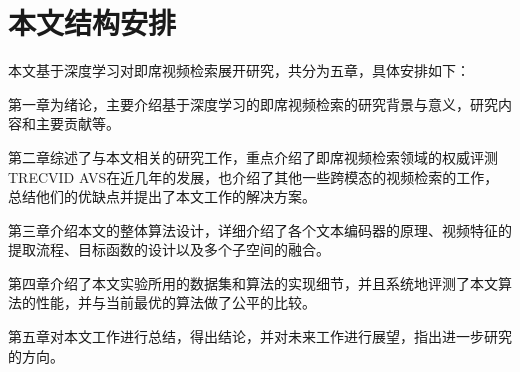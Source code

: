\section{本文结构安排}
本文基于深度学习对即席视频检索展开研究，共分为五章，具体安排如下：

第一章为绪论，主要介绍基于深度学习的即席视频检索的研究背景与意义，研究内容和主要贡献等。

第二章综述了与本文相关的研究工作，重点介绍了即席视频检索领域的权威评测TRECVID AVS在近几年的发展，也介绍了其他一些跨模态的视频检索的工作，总结他们的优缺点并提出了本文工作的解决方案。

第三章介绍本文的整体算法设计，详细介绍了各个文本编码器的原理、视频特征的提取流程、目标函数的设计以及多个子空间的融合。

第四章介绍了本文实验所用的数据集和算法的实现细节，并且系统地评测了本文算法的性能，并与当前最优的算法做了公平的比较。

第五章对本文工作进行总结，得出结论，并对未来工作进行展望，指出进一步研究的方向。

